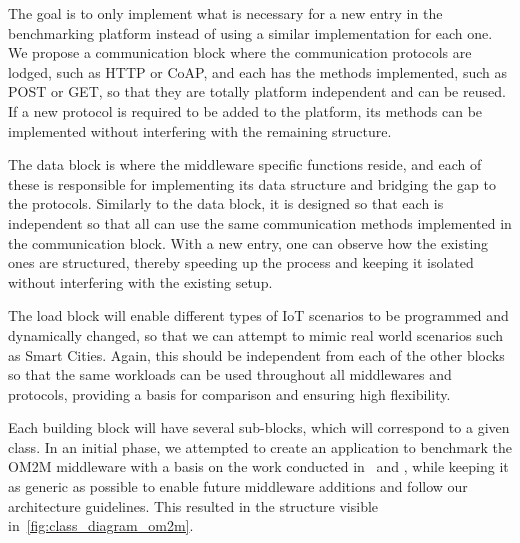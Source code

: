 \documentclass[conference]{IEEEtran}
\begin{document}
The goal is to only implement what is necessary for a new entry in the benchmarking platform instead of using a similar implementation for each one. We propose a communication block where the communication protocols are lodged, such as HTTP or CoAP, and each has the methods implemented, such as POST or GET, so that they are totally platform independent and can be reused. If a new protocol is required to be added to the platform, its methods can be implemented without interfering with the remaining structure.

The data block is where the middleware specific functions reside, and each of these is responsible for implementing its data structure and bridging the gap to the protocols. Similarly to the data block, it is designed so that each is independent so that all can use the same communication methods implemented in the communication block. With a new entry, one can observe how the existing ones are structured, thereby speeding up the process and keeping it isolated without interfering with the existing setup. 

The load block will enable different types of IoT scenarios to be programmed and dynamically changed, so that we can attempt to mimic real world scenarios such as Smart Cities. Again, this should be independent from each of the other blocks so that the same workloads can be used throughout all middlewares and protocols, providing a basis for comparison and ensuring high flexibility.

Each building block will have several sub-blocks, which will correspond to a given class. In an initial phase, we attempted to create an application to benchmark the OM2M middleware with a basis on the work conducted in~\cite{pereira_benchmarking_2018} and \cite{cardoso_benchmarking_2017} , while keeping it as generic as possible to enable future middleware additions and follow our architecture guidelines. This resulted in the structure visible in~\ref{fig:class_diagram_om2m}.
\end{document}
